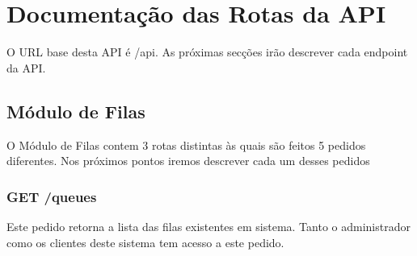 \appendix

\chapter{Documentação das Rotas da API}

O URL base desta API é /api. As próximas secções irão descrever cada endpoint da API.

\section{Módulo de Filas}
O Módulo de Filas contem 3 rotas distintas às quais são feitos 5 pedidos diferentes. Nos próximos pontos 
iremos descrever cada um desses pedidos
\subsection{GET /queues}
Este pedido retorna a lista das filas existentes em sistema. Tanto o administrador como os clientes deste sistema tem acesso a este pedido.

